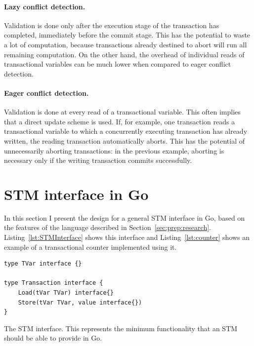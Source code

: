 \documentclass[12pt,a4paper,oneside,openright]{report}
\newcommand{\mycaption}[2]{\caption[#1]{#1 #2}}
\begin{document}
\paragraph{Lazy conflict detection.} Validation is done only after the
execution stage of the transaction has completed, immediately before
the commit stage. This has the potential to waste a lot of
computation, because transactions already destined to abort will run
all remaining computation. On the other hand, the overhead of
individual reads of transactional variables can be much lower when
compared to eager conflict detection.

\paragraph{Eager conflict detection.} Validation is done at every read
of a transactional variable. This often implies that a direct update
scheme is used. If, for example, one transaction reads a transactional
variable to which a concurrently executing transaction has already
written, the reading transaction automatically aborts. This has the
potential of unnecessarily aborting transactions: in the previous
example, aborting is necessary only if the writing transaction commits
successfully.

\section{STM interface in Go}
\label{sec:design-decisions}

In this section I present the design for a general STM interface in
Go, based on the features of the language described in
Section~\ref{sec:prep:research}. Listing~\ref{lst:STMInterface} shows
this interface and Listing~\ref{lst:counter} shows an example of a
transactional counter implemented using it.

\begin{Listing}[hbtp]
\begin{lstlisting}
type TVar interface {}

type Transaction interface {
	Load(tVar TVar) interface{}
	Store(tVar TVar, value interface{})
}
\end{lstlisting}

  \mycaption{The STM interface.}{This represents the minimum
    functionality that an STM should be able to provide in Go.}
  \label{lst:STMInterface}
\end{Listing}
\end{document}
